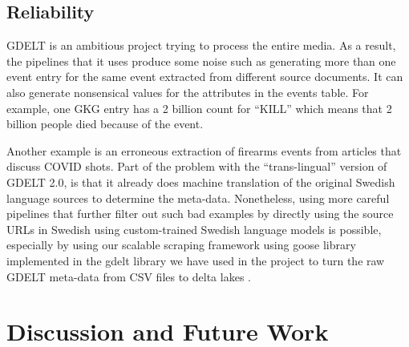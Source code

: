 \documentclass[a4, 11pt]{article}
\begin{document}
\subsection{Reliability}

GDELT is an ambitious project trying to process the entire media. As a
result, the pipelines that it uses produce some noise such as generating more
than one event entry for the same event extracted from different source documents. It
can also generate nonsensical values for the attributes in the events table. 
For example, one GKG entry has a 2 billion count for ``KILL'' which means that 2 billion 
people died because of the event. 

Another example is an erroneous extraction of firearms events from
articles that discuss COVID shots. 
Part of the problem with the ``trans-lingual'' version of GDELT 2.0, is that it already does machine translation of the original Swedish language sources to determine the meta-data. 
Nonetheless, using more careful pipelines that further filter out such bad examples by directly using the source URLs in Swedish using custom-trained Swedish language models is possible, especially by using our scalable scraping framework using goose library implemented in the gdelt library \cite{lamastex-spark-gdelt} we have used in the project to turn the raw GDELT meta-data from CSV files to delta lakes \cite{delta_io}.


\section{Discussion and Future Work}
\end{document}
